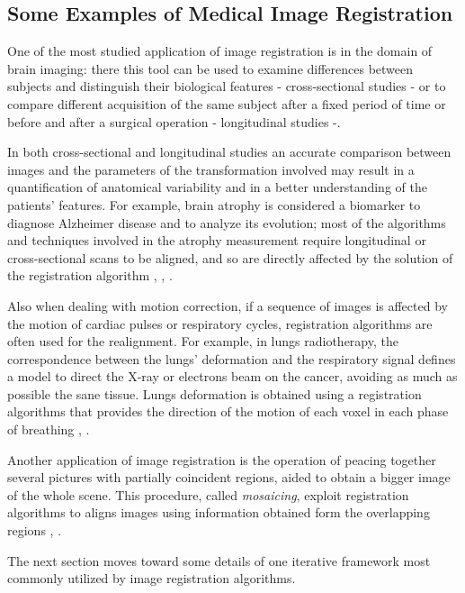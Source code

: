 \subsection{Some Examples of Medical Image Registration}
One of the most studied application of image registration is in the domain of brain imaging: there this tool can be used to examine differences between subjects and distinguish their biological features - cross-sectional studies - or to compare different acquisition of the same subject after a fixed period of time or before and after a surgical operation - longitudinal studies -. 

In both cross-sectional and longitudinal studies an accurate comparison between images and the parameters of the transformation involved may result in a quantification of anatomical variability and in a better understanding of the patients' features. 
%
For example, brain atrophy is considered a biomarker to diagnose Alzheimer disease and to analyze its evolution; most of the algorithms and techniques involved in the atrophy measurement require longitudinal or cross-sectional scans to be aligned, and so are directly affected by the solution of the registration algorithm \cite{prados2015measuring}, \cite{fox1997brain}, \cite{gauthier2012prevention}. 

Also when dealing with motion correction, if a sequence of images is affected by the motion of cardiac pulses or respiratory cycles, registration algorithms are often used for the realignment. 
For example, in lungs radiotherapy, the correspondence between the lungs' deformation and the respiratory signal defines a model to direct the X-ray or electrons beam on the cancer, avoiding as much as possible the sane tissue. Lungs deformation is obtained using a registration algorithms that provides the direction of the motion of each voxel in each phase of breathing \cite{mcclelland}, \cite{mcclelland2011inter}.

Another application of image registration is the operation of peacing together several pictures with partially coincident regions, aided to obtain a bigger image of the whole scene. This procedure, called \emph{mosaicing}, exploit registration algorithms to aligns images using information obtained form the overlapping regions \cite{vercauteren2006robust}, \cite{szeliski1994image}.

The next section moves toward some details of one iterative framework most commonly utilized by image registration algorithms.


